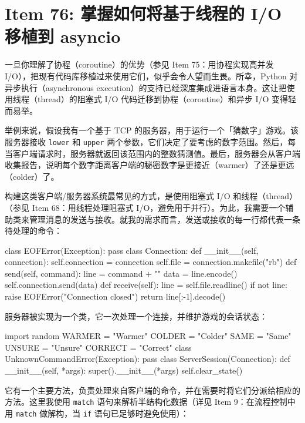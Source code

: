 \section{Item 76: 掌握如何将基于线程的 I/O 移植到 asyncio}

一旦你理解了协程（coroutine）的优势（参见 Item 75：用协程实现高并发 I/O），把现有代码库移植过来使用它们，似乎会令人望而生畏。所幸，Python 对异步执行（asynchronous execution）的支持已经深度集成进语言本身。这让把使用线程（thread）的阻塞式 I/O 代码迁移到协程（coroutine）和异步 I/O 变得轻而易举。

举例来说，假设我有一个基于 TCP 的服务器，用于运行一个「猜数字」游戏。该服务器接收 \texttt{lower} 和 \texttt{upper} 两个参数，它们决定了要考虑的数字范围。然后，每当客户端请求时，服务器就返回该范围内的整数猜测值。最后，服务器会从客户端收集报告，说明每个数字距离客户端的秘密数字是更接近（warmer）了还是更远（colder）了。

构建这类客户端/服务器系统最常见的方式，是使用阻塞式 I/O 和线程（thread）（参见 Item 68：用线程处理阻塞式 I/O，避免用于并行）。为此，我需要一个辅助类来管理消息的发送与接收。就我的需求而言，发送或接收的每一行都代表一条待处理的命令：

\begin{codebox}[python]
class EOFError(Exception):
    pass
class Connection:
    def __init__(self, connection):
        self.connection = connection
        self.file = connection.makefile("rb")
    def send(self, command):
        line = command + "\n"
        data = line.encode()
        self.connection.send(data)
    def receive(self):
        line = self.file.readline()
        if not line:
            raise EOFError("Connection closed")
        return line[:-1].decode()
\end{codebox}

服务器被实现为一个类，它一次处理一个连接，并维护游戏的会话状态：

\begin{codebox}[python]
import random
WARMER = "Warmer"
COLDER = "Colder"
SAME = "Same"
UNSURE = "Unsure"
CORRECT = "Correct"
class UnknownCommandError(Exception):
    pass
class ServerSession(Connection):
    def __init__(self, *args):
        super().__init__(*args)
        self.clear_state()
\end{codebox}

它有一个主要方法，负责处理来自客户端的命令，并在需要时将它们分派给相应的方法。这里我使用 \texttt{match} 语句来解析半结构化数据（详见 Item 9：在流程控制中用 \texttt{match} 做解构，当 \texttt{if} 语句已足够时避免使用）：

